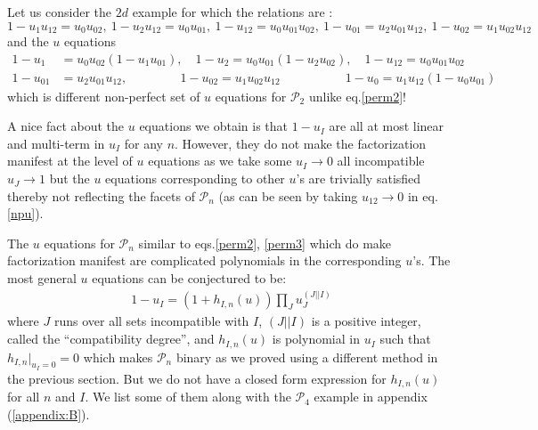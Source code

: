 \documentclass[hidelinks,12pt]{article}
\newcommand{\bea}[1]{\begin{eqnarray}\label{#1} }
\newcommand{\eea}{\end{eqnarray}}
\def\bea{\begin{eqnarray}}
\def\eea{\end{eqnarray}}
\begin{document}
Let us consider the $2 d$ example for which the relations are :
\[
1-u_1 u_{12} =u_0 u_{02}, ~1-u_2 u_{12} =u_0 u_{01},~1-u_{12}= u_0 u_{01} u_{02},~1- u_{01}= u_2 u_{01}u_{12},~1-u_{02}= u_1 u_{02} u_{12}
\]
and the $u$ equations
\begin{align}\label{npu}
1-u_1&=u_0 u_{02}(1-u_1 u_{01}), \quad 1-u_2 =u_0 u_{01}(1-u_2 u_{02}),\quad 1-u_{12}= u_0 u_{01} u_{02} \nonumber\\
1- u_{01}&= u_2 u_{01}u_{12},\qquad \qquad \:1-u_{02} = u_1 u_{02} u_{12} \quad\qquad \qquad \: 1-u_0=u_1 u_{12}(1-u_0 u_{01})
\end{align}
which is different non-perfect set of $u$ equations for ${\mathscr P}_2$ unlike eq.\eqref{perm2}!

A nice fact about the $u$ equations we obtain is that $1-u_I$ are all at most linear and multi-term in $u_I$ for any $n$.
However, they do not make the factorization manifest at the level of $u$ equations as we take some $u_I \rightarrow 0$ all incompatible $u_J \rightarrow 1$ but the $u$ equations corresponding to other $u$'s are trivially satisfied thereby not reflecting the facets of ${\mathscr P}_n$ (as can be seen by taking $u_{12} \rightarrow 0$ in eq.\eqref{npu}).

The $u$ equations for $\mathscr{P}_n$ similar to eqs.\eqref{perm2}, \eqref{perm3} which do make factorization manifest are complicated polynomials %
in the corresponding $u$'s. 
The most general $u$ equations can be conjectured to be:
\bea \label{ueqforpn}
1-u_{I} = (1+h_{I,n}(u)) \prod_{J} u^{(J||I)}_{J} 
\eea
where $J$ runs over all sets incompatible with $I$, $(J||I)$ is a positive integer, called the ``compatibility degree'', and $h_{I,n}(u)$ is polynomial %
in $u_I$ such that $h_{I,n}|_{u_I =0} = 0$ which makes $\mathscr{P}_n$ binary as we proved using a different method in the previous section. But we do not have a closed form expression for $h_{I,n}(u)$ for all $n$ and $I$. We list some of them along with the ${\mathscr P_4}$ example in appendix (\ref{appendix:B}). 



\end{document}
